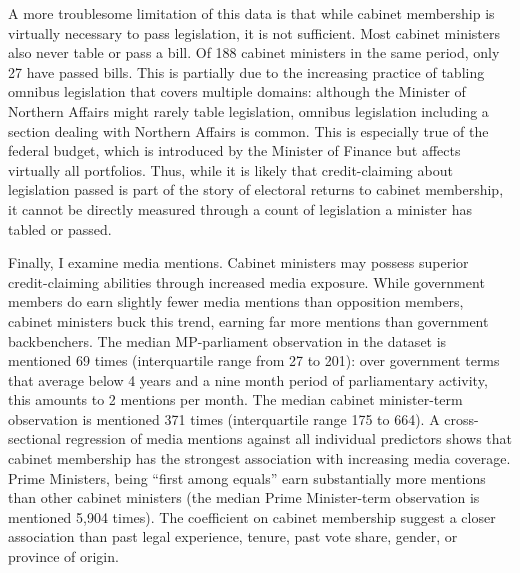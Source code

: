 \documentclass[letter,12pt]{article}
\begin{document}
A more troublesome limitation of this data is that while cabinet membership is virtually necessary to pass legislation, it is not sufficient. Most cabinet ministers also never table or pass a bill. Of 188 cabinet ministers in the same period, only 27 have passed bills. This is partially due to the increasing practice of tabling omnibus legislation that covers multiple domains: although the Minister of Northern Affairs might rarely table legislation, omnibus legislation including a section dealing with Northern Affairs is common. This is especially true of the federal budget, which is introduced by the Minister of Finance but affects virtually all portfolios. Thus, while it is likely that credit-claiming about legislation passed is part of the story of electoral returns to cabinet membership, it cannot be directly measured through a count of legislation a minister has tabled or passed.

Finally, I examine media mentions. Cabinet ministers may possess superior credit-claiming abilities through increased media exposure. While government members do earn slightly fewer media mentions than opposition members, cabinet ministers buck this trend, earning far more mentions than government backbenchers. The median MP-parliament observation in the dataset is mentioned 69 times (interquartile range from 27 to 201): over government terms that average below 4 years and a nine month period of parliamentary activity, this amounts to 2 mentions per month. The median cabinet minister-term observation is mentioned 371 times (interquartile range 175 to 664). A cross-sectional regression of media mentions against all individual predictors shows that cabinet membership has the strongest association with increasing media coverage. Prime Ministers, being ``first among equals'' earn substantially more mentions than other cabinet ministers (the median Prime Minister-term observation is mentioned 5,904 times). The coefficient on cabinet membership suggest a closer association than past legal experience, tenure, past vote share, gender, or province of origin.
\end{document}
